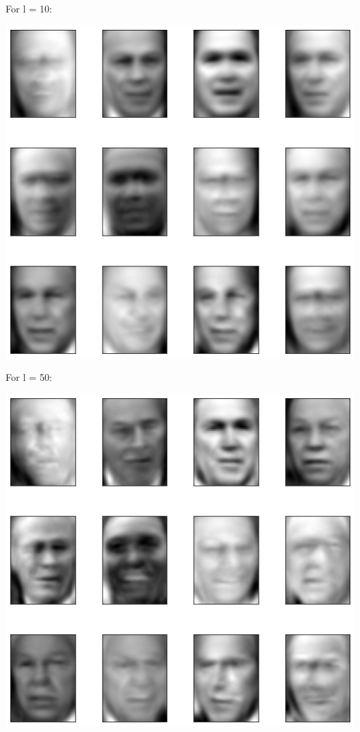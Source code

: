 \documentclass[11pt]{article}
\begin{document}
For l = 10:
\begin{center}
    \includegraphics[scale=0.6]{1c-2.png}
\end{center}

For l = 50:
\begin{center}
    \includegraphics[scale=0.6]{1c-3.png}
\end{center}
\end{document}
